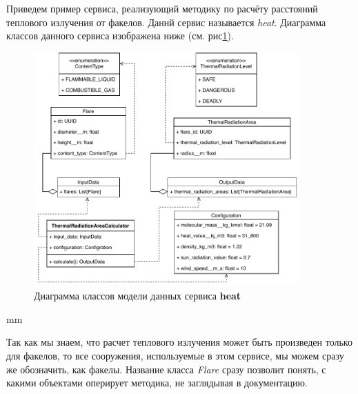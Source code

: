 Приведем пример сервиса, реализующий
методику по расчёту расстояний теплового излучения от факелов. Даннй сервис называется \textit{heat}. Диаграмма классов
данного сервиса изображена ниже (см. рис\ref{pic:implementation__math-classes}).
\begin{figure}[H]
	\hspace*{-2.5 cm}\includegraphics[width=0.9\textwidth]{implementation/pictures/math/classes}
	\caption{Диаграмма классов модели данных сервиса \textbf{heat}}
	\label{pic:implementation__math-classes}
\end{figure}
 mm

Так как мы знаем, что расчет теплового излучения может быть произведен только для факелов, то все сооружения,
используемые в этом сервисе, мы можем сразу же обозначить, как факелы. Название класса \textit{Flare} сразу позволит
понять, с какими объектами оперирует методика, не заглядывая в документацию.